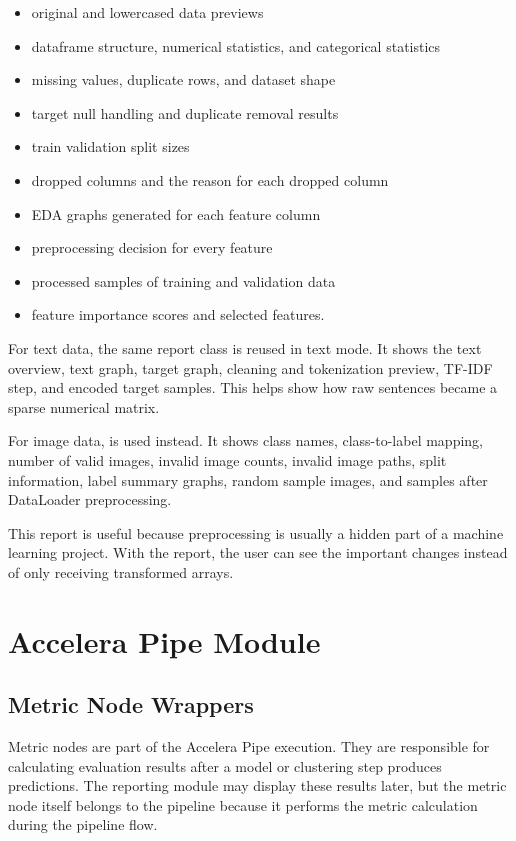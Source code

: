 \documentclass[12pt,a4paper,oneside]{report}
\DeclareRobustCommand{\modulepath}[1]{\path{#1}}
\begin{document}
\begin{itemize}[leftmargin=*]
  \item original and lowercased data previews
  \item dataframe structure, numerical statistics, and categorical statistics
  \item missing values, duplicate rows, and dataset shape
  \item target null handling and duplicate removal results
  \item train validation split sizes
  \item dropped columns and the reason for each dropped column
  \item EDA graphs generated for each feature column
  \item preprocessing decision for every feature
  \item processed samples of training and validation data 
  \item feature importance scores and selected features.
\end{itemize}

\noindent For text data, the same report class is reused in text mode. It shows the text
overview, text graph, target graph, cleaning and tokenization preview, TF-IDF
step, and encoded target samples. This helps show how raw
sentences became a sparse numerical matrix.

\noindent For image data, \modulepath{ImagePreprocessingReport} is used instead. It shows class names, class-to-label mapping, number
of valid images, invalid image counts, invalid image paths, split information,
label summary graphs, random sample images, and samples after DataLoader
preprocessing.

\noindent This report is useful because preprocessing is usually a hidden part of a
machine learning project. With the report, the user can see the important
changes instead of only receiving transformed arrays.


\section{Accelera Pipe Module}

\subsection{Metric Node Wrappers}

Metric nodes are part of the Accelera Pipe execution. They are responsible
for calculating evaluation results after a model or clustering step produces
predictions. The reporting module may display these results later, but the
metric node itself belongs to the pipeline because it performs the metric
calculation during the pipeline flow.
\end{document}
